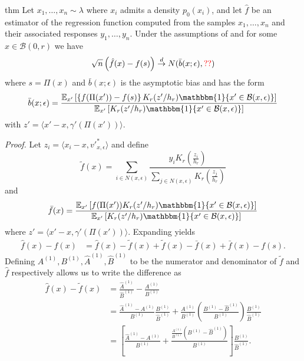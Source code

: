 \documentclass[11pt]{article}
\begin{document}
\begin{restatable}{thm}{} 
    Let $x_1, \dots, x_n \sim \lambda$ where $x_i$ admits a density $p_0(x_i)$, and let $\hat{f}$ be an estimator of the regression function computed from the samples $x_1, \dots, x_n$ and their associated responses $y_1, \dots, y_n$. Under the assumptions of  and for some $x\in \mathcal{B}(0, r)$ we have
    \[\sqrt{n}\left(\hat{f}(x) - f(s)\right) \overset{d}{\rightarrow} N(\bar{b}(x; \epsilon), \textcolor{red}{??}) \]
    where $s = \Pi(x)$ and $\bar{b}(x;\epsilon)$ is the asymptotic bias and has the form
    \begin{equation}
        \bar{b}(x; \epsilon) = \frac{\mathbb{E}_{x'}\left[\left\{f(\Pi(x')) - f(s)\right\}K_r(z'/h_r)\mathbbm{1}\{x'\in \mathcal{B}(x, \epsilon)\}\right]}{\mathbb{E}_{x'}\left[K_r(z'/h_r)\mathbbm{1}\{x'\in \mathcal{B}(x, \epsilon)\}\right]}
    \end{equation}
    with $z' = \langle x' - x, \gamma'(\Pi(x'))\rangle.$
\end{restatable}
\noindent \textit{Proof.} Let $z_i = \langle x_i - x, v'^*_{x, \epsilon}\rangle$ and define
\[\tilde{f}(x) = \sum_{i \in N(x, \epsilon)}\frac{y_iK_r(\frac{z_i}{h_r})}{\sum_{j \in N(x, \epsilon)}K_r(\frac{z_j}{h_r})}\]
and
\[\bar{f}(x) = \frac{\mathbb{E}_{x'}\left[f(\Pi(x'))K_r(z'/h_r)\mathbbm{1}\{x'\in \mathcal{B}(x, \epsilon)\}\right]}{\mathbb{E}_{x'}\left[K_r(z'/h_r)\mathbbm{1}\{x'\in \mathcal{B}(x, \epsilon)\}\right]}\]
where $z' = \langle x'-x,\gamma'(\Pi(x'))\rangle$. Expanding yields
\begin{align}
    \hat{f}(x) - f(x) &= \hat{f}(x) - \tilde{f}(x) + 
    \tilde{f}(x) - \bar{f}(x) + \bar{f}(x) - f(s).
\end{align}
Defining $A^{(1)}, B^{(1)}, \widehat{A}^{(1)}, \widehat{B}^{(1)}$ to be the numerator and denominator of $\tilde{f}$ and $\hat{f}$ respectively allows us to write the difference as
\begin{align}
    \hat{f}(x) - \tilde{f}(x)  &= \frac{\widehat{A}^{(1)}}{\widehat{B}^{(1)}} - \frac{A^{(1)}}{B^{(1)}} \\
    &= \frac{\widehat{A}^{(1)}-A^{(1)}}{B^{(1)}}\frac{B^{(1)}}{\widehat{B}^{(1)}} + \frac{A^{(1)}}{B^{(1)}}\left(\frac{B^{(1)} - \widehat{B}^{(1)}}{B^{(1)}}\right)\frac{B^{(1)}}{\widehat{B}^{(1)}} \\
    &= 
    \left[\frac{\widehat{A}^{(1)}-A^{(1)}}{B^{(1)}} + \frac{\frac{A^{(1)}}{B^{(1)}}\left(B^{(1)} - \widehat{B}^{(1)}\right)}{B^{(1)}}\right]\frac{B^{(1)}}{\widehat{B}^{(1)}}. \label{eq: kdr estimator decomp}
\end{align}
\end{document}
